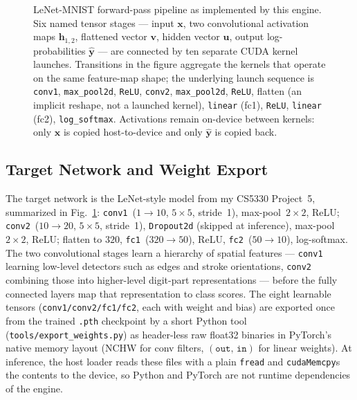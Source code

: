 \documentclass[conference]{IEEEtran}
\begin{document}
\begin{figure}[!t]
\caption{LeNet-MNIST forward-pass pipeline as implemented by this
engine. Six named tensor stages --- input $\mathbf{x}$, two
convolutional activation maps $\mathbf{h}_{1,2}$, flattened vector
$\mathbf{v}$, hidden vector $\mathbf{u}$, output log-probabilities
$\hat{\mathbf{y}}$ --- are connected by ten separate CUDA kernel
launches. Transitions in the figure aggregate the kernels that
operate on the same feature-map shape; the underlying launch
sequence is \texttt{conv1}, \texttt{max\_pool2d}, \texttt{ReLU},
\texttt{conv2}, \texttt{max\_pool2d}, \texttt{ReLU}, flatten (an
implicit reshape, not a launched kernel), \texttt{linear} (fc1),
\texttt{ReLU}, \texttt{linear} (fc2), \texttt{log\_softmax}.
Activations remain on-device between kernels: only $\mathbf{x}$ is
copied host-to-device and only $\hat{\mathbf{y}}$ is copied back.}
\label{fig:pipeline}
\end{figure}

\subsection{Target Network and Weight Export}
The target network is the LeNet-style model from my CS5330
Project~5, summarized in
Fig.~\ref{fig:pipeline}: \texttt{conv1}~($1{\to}10$, $5{\times}5$,
stride~1), max-pool~$2{\times}2$, ReLU; \texttt{conv2}~($10{\to}20$,
$5{\times}5$, stride~1), \texttt{Dropout2d} (skipped at inference),
max-pool~$2{\times}2$, ReLU; flatten to $320$, \texttt{fc1}~($320{\to}50$),
ReLU, \texttt{fc2}~($50{\to}10$), log-softmax. The two convolutional
stages learn a hierarchy of spatial features --- \texttt{conv1}
learning low-level detectors such as edges and stroke orientations,
\texttt{conv2} combining those into higher-level digit-part
representations --- before the fully connected layers map that
representation to class scores. The eight learnable
tensors (\texttt{conv1/conv2/fc1/fc2}, each with weight and bias) are
exported once from the trained \texttt{.pth} checkpoint by a short
Python tool (\texttt{tools/export\_weights.py}) as header-less raw
float32 binaries in PyTorch's native memory layout (NCHW for conv
filters, $(\texttt{out},\,\texttt{in})$ for linear weights). At
inference, the host loader reads these files with a plain
\texttt{fread} and \texttt{cudaMemcpy}s the contents to the device,
so Python and PyTorch are not runtime dependencies of the engine.
\end{document}
